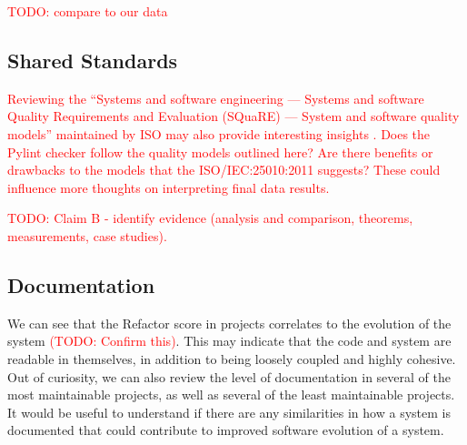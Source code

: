 \documentclass[12pt,conference]{IEEEtran}
\newcommand\todo[1]{\textcolor{red}{#1}}
\begin{document}
\todo{TODO: compare \cite{baggen:2012} to our data}

\subsection{Shared Standards} \label{sectionSharedStandards}


\todo{Reviewing the ``Systems and software engineering — Systems and software Quality Requirements and Evaluation (SQuaRE) — System and software quality models'' maintained by ISO may also provide interesting insights \cite{iso/iec:25010:2011}. Does the Pylint checker follow the quality models outlined here? Are there benefits or drawbacks to the models that the ISO/IEC:25010:2011 suggests? These could influence more thoughts on interpreting final data results.}


\todo{TODO: Claim B - identify evidence (analysis and comparison, theorems, measurements, case studies).}

\subsection{Documentation} \label{sectionDocumentation}


We can see that the Refactor score in projects correlates to the evolution of the system \todo{(TODO: Confirm this)}. This may indicate that the code and system are readable in themselves, in addition to being loosely coupled and highly cohesive. Out of curiosity, we can also review the level of documentation in several of the most maintainable projects, as well as several of the least maintainable projects. It would be useful to understand if there are any similarities in how a system is documented that could contribute to improved software evolution of a system.
\end{document}
